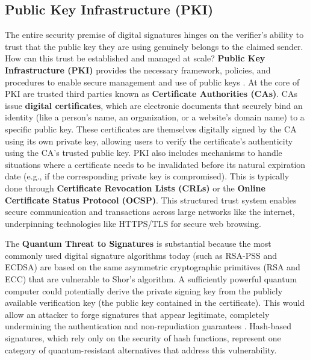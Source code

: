 \subsection{Public Key Infrastructure (PKI)}
The entire security premise of digital signatures hinges on the verifier's ability to trust that the public key they are using genuinely belongs to the claimed sender. How can this trust be established and managed at scale? \textbf{Public Key Infrastructure (PKI)} provides the necessary framework, policies, and procedures to enable secure management and use of public keys \parencite{stallings2017cryptography}. At the core of PKI are trusted third parties known as \textbf{Certificate Authorities (CAs)}. CAs issue \textbf{digital certificates}, which are electronic documents that securely bind an identity (like a person's name, an organization, or a website's domain name) to a specific public key. These certificates are themselves digitally signed by the CA using its own private key, allowing users to verify the certificate's authenticity using the CA's trusted public key. PKI also includes mechanisms to handle situations where a certificate needs to be invalidated before its natural expiration date (e.g., if the corresponding private key is compromised). This is typically done through \textbf{Certificate Revocation Lists (CRLs)} or the \textbf{Online Certificate Status Protocol (OCSP)}. This structured trust system enables secure communication and transactions across large networks like the internet, underpinning technologies like HTTPS/TLS for secure web browsing.

The \textbf{Quantum Threat to Signatures} is substantial because the most commonly used digital signature algorithms today (such as RSA-PSS and ECDSA) are based on the same asymmetric cryptographic primitives (RSA and ECC) that are vulnerable to Shor's algorithm. A sufficiently powerful quantum computer could potentially derive the private signing key from the publicly available verification key (the public key contained in the certificate). This would allow an attacker to forge signatures that appear legitimate, completely undermining the authentication and non-repudiation guarantees \parencite{bernstein2017post}. Hash-based signatures, which rely only on the security of hash functions, represent one category of quantum-resistant alternatives that address this vulnerability.

